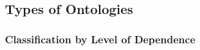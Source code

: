 

\subsection{Types of Ontologies}
\label{subsec:types-otologies}


\subsubsection{Classification by Level of Dependence}
\label{subsubsec:classification-level-dependence}



